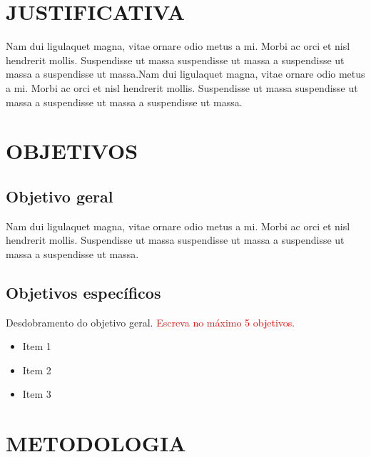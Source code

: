 \section{JUSTIFICATIVA}
Nam dui ligulaquet magna, vitae ornare odio metus a mi. Morbi ac orci et nisl hendrerit mollis. Suspendisse ut massa suspendisse ut massa a suspendisse ut massa a suspendisse ut massa.Nam dui ligulaquet magna, vitae ornare odio metus a mi. Morbi ac orci et nisl hendrerit mollis. Suspendisse ut massa suspendisse ut massa a suspendisse ut massa a suspendisse ut massa.

\section{OBJETIVOS}

\subsection{Objetivo geral}
Nam dui ligulaquet magna, vitae ornare odio metus a mi. Morbi ac orci et nisl hendrerit mollis. Suspendisse ut massa suspendisse ut massa a suspendisse ut massa a suspendisse ut massa.

\subsection{Objetivos específicos}
Desdobramento do objetivo geral. \textcolor{red}{Escreva no máximo 5 objetivos.}
 \begin{itemize}
	\item Item 1
	\item Item 2
	\item Item 3
\end{itemize}

 \section{METODOLOGIA}
 \lipsum[1-1]